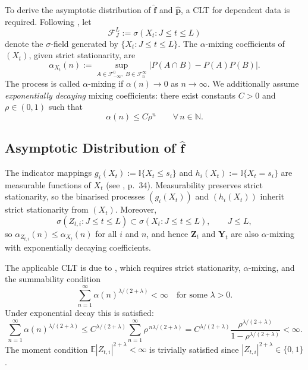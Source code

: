 \documentclass[12pt,a4paper]{scrreprt}
\begin{document}
To derive the asymptotic distribution of $\hat{\mathbf{f}}$ and $\hat{\mathbf{p}}$, a CLT for
dependent data is required. Following \citet{Bradley2005}, let
\[
    \mathcal{F}_J^L := \sigma(X_t : J \leq t \leq L)
\]
denote the $\sigma$-field generated by $\{X_t : J \leq t \leq L\}$. The $\alpha$-mixing
coefficients of $(X_t)$, given strict stationarity, are
\[
    \alpha_{X_t}(n)
    := \sup_{A \in \mathcal{F}_{-\infty}^0,\; B \in \mathcal{F}_{n}^{\infty}}
    \bigl| P(A \cap B) - P(A)P(B) \bigr|.
\]
The process is called $\alpha$-mixing if $\alpha(n) \to 0$ as $n \to \infty$. We additionally
assume \emph{exponentially decaying} mixing coefficients: there exist constants $C > 0$ and
$\rho \in (0,1)$ such that
\[
    \alpha(n) \leq C\rho^n \qquad \forall\, n \in \mathbb{N}.
\]

\subsection{Asymptotic Distribution of \texorpdfstring{$\hat{\mathbf{f}}$}{f-hat}}

The indicator mappings $g_i(X_t) := \mathbb{I}\{X_t \leq s_i\}$ and
$h_i(X_t) := \mathbb{I}\{X_t = s_i\}$ are measurable functions of $X_t$
(see \citealt{Klenke2005}, p.~34). Measurability preserves strict stationarity, so the
binarised processes $(g_i(X_t))$ and $(h_i(X_t))$ inherit strict stationarity from $(X_t)$.
Moreover,
\[
    \sigma(Z_{t,i} : J \leq t \leq L) \subset \sigma(X_t : J \leq t \leq L),
    \qquad J \leq L,
\]
so $\alpha_{Z_{t,i}}(n) \leq \alpha_{X_t}(n)$ for all $i$ and $n$, and hence $\mathbf{Z}_t$
and $\mathbf{Y}_t$ are also $\alpha$-mixing with exponentially decaying coefficients.

The applicable CLT is due to \citet{Ibragimov1962}, which requires strict stationarity,
$\alpha$-mixing, and the summability condition
\[
    \sum_{n=1}^{\infty} \alpha(n)^{\lambda/(2+\lambda)} < \infty
    \quad \text{for some } \lambda > 0.
\]
Under exponential decay this is satisfied:
\[
    \sum_{n=1}^{\infty} \alpha(n)^{\lambda/(2+\lambda)}
    \leq C^{\lambda/(2+\lambda)} \sum_{n=1}^{\infty} \rho^{\,n\lambda/(2+\lambda)}
    = C^{\lambda/(2+\lambda)} \frac{\rho^{\lambda/(2+\lambda)}}{1-\rho^{\lambda/(2+\lambda)}}
    < \infty.
\]
The moment condition $\mathbb{E}|Z_{t,i}|^{2+\lambda} < \infty$ is trivially satisfied since
$|Z_{t,i}|^{2+\lambda} \in \{0,1\}$.
\end{document}
